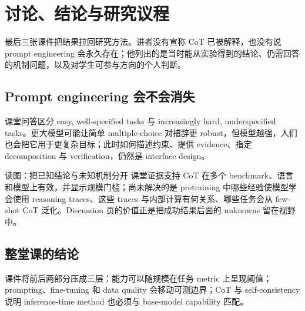 \section{讨论、结论与研究议程}

最后三张课件把结果拉回研究方法。讲者没有宣称 CoT 已被解释，也没有说 prompt engineering 会永久存在；他列出的是当时能从实验得到的结论、仍需回答的机制问题，以及对学生可参与方向的个人判断。

\subsection{Prompt engineering 会不会消失}

课堂问答区分 easy, well-specified tasks 与 increasingly hard, underspecified tasks。更大模型可能让简单 multiple-choice 对措辞更 robust，但模型越强，人们也会把它用于更复杂目标；此时如何描述约束、提供 evidence、指定 decomposition 与 verification，仍然是 interface design。


\begin{knowledgebox}{读图：把已知结论与未知机制分开}
课堂证据支持 CoT 在多个 benchmark、语言和模型上有效，并显示规模门槛；尚未解决的是 pretraining 中哪些经验使模型学会使用 reasoning traces、这些 traces 与内部计算有何关系、哪些任务会从 few-shot CoT 泛化。Discussion 页的价值正是把成功结果后面的 unknowns 留在视野中。
\end{knowledgebox}


\subsection{整堂课的结论}

课件将前后两部分压成三层：能力可以随规模在任务 metric 上呈现阈值；prompting、fine-tuning 和 data quality 会移动可测边界；CoT 与 self-consistency 说明 inference-time method 也必须与 base-model capability 匹配。


